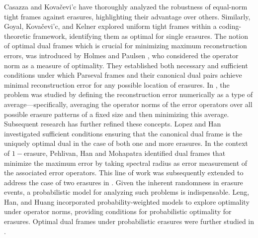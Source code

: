 \documentclass[final,1p,times]{elsarticle}
\begin{document}
Casazza and Kova{\v{c}}evi{'c} \cite{casa2} have thoroughly analyzed the robustness of equal-norm tight frames against erasures, highlighting their advantage over others. Similarly, Goyal, Kova{\v{c}}evi{'c}, and Kelner \cite{goya} explored uniform tight frames within a coding-theoretic framework, identifying them as optimal for single erasures. The notion of optimal dual frames which is crucial for minimizing maximum reconstruction errors, was introduced by Holmes and Paulsen \cite{holm}, who considered the operator norm as a measure of optimality. They established both necessary and sufficient conditions under which Parseval frames and their canonical dual pairs achieve minimal reconstruction error for any possible location of erasures. In \cite{bodm1}, the problem was studied by defining the reconstruction error numerically as a type of average—specifically, averaging the operator norms of the error operators over all possible erasure patterns of a fixed size and then minimizing this average. Subsequent research has further refined these concepts. Lopez and Han \cite{jerr} investigated sufficient conditions ensuring that the canonical dual frame is the uniquely optimal dual in the case of both one and more erasures. In the context of $1-$erasure, Pehlivan, Han and Mohapatra \cite{sali} identified dual frames that minimize the maximum error by taking spectral radius as error measurement of the associated error operators. This line of work was subsequently extended to address the case of two erasures in \cite{peh,dev}. Given the inherent randomness in erasure events, a probabilistic model for analyzing such problems is indispensable. Leng, Han, and Huang \cite{leng3, leng} incorporated probability-weighted models to explore optimality under operator norms, providing conditions for probabilistic optimality for erasures. Optimal dual frames under probabilistic erasures were further studied in \cite{shan4, li2}.
\end{document}
